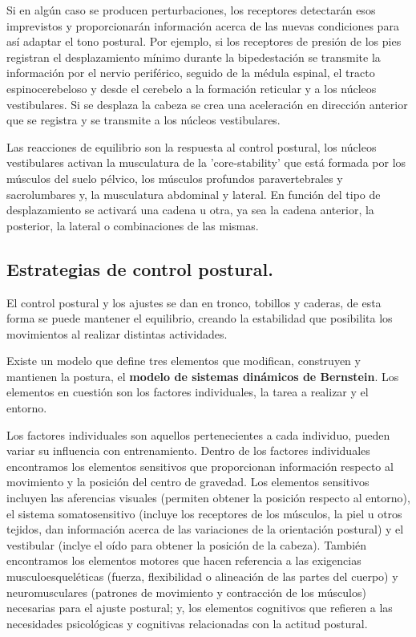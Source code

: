 Si en algún caso se producen perturbaciones, los receptores detectarán esos imprevistos y proporcionarán información acerca de las nuevas condiciones para así adaptar el tono postural. Por ejemplo, si los receptores de presión de los pies registran el desplazamiento mínimo durante la bipedestación se transmite la información por el nervio periférico, seguido de la médula espinal, el tracto espinocerebeloso y desde el cerebelo a la formación reticular y a los núcleos vestibulares. Si se desplaza la cabeza se crea una aceleración en dirección anterior que se registra y se transmite a los núcleos vestibulares. 

Las reacciones de equilibrio son la respuesta al control postural, los núcleos vestibulares activan la musculatura de la 'core-stability' que está formada por los músculos del suelo pélvico, los músculos profundos paravertebrales y sacrolumbares y, la musculatura abdominal y lateral. En función del tipo de desplazamiento se activará una cadena u otra, ya sea la cadena anterior, la posterior, la lateral o combinaciones de las mismas.

\subsection{Estrategias de control postural.} 
El control postural y los ajustes se dan en tronco, tobillos y caderas, de esta forma se puede mantener el equilibrio, creando la estabilidad que posibilita los movimientos al realizar distintas actividades.

Existe un modelo que define tres elementos que modifican, construyen y mantienen la postura, el \textbf{modelo de sistemas dinámicos de Bernstein}. Los elementos en cuestión son los factores individuales, la tarea a realizar y el entorno. 

Los factores individuales son aquellos pertenecientes a cada individuo, pueden variar su influencia con entrenamiento. Dentro de los factores individuales encontramos los elementos sensitivos que proporcionan información respecto al movimiento y la posición del centro de gravedad. Los elementos sensitivos incluyen las aferencias visuales (permiten obtener la posición respecto al entorno), el sistema somatosensitivo (incluye los receptores de los músculos, la piel u otros tejidos, dan información acerca de las variaciones de la orientación postural) y el vestibular (inclye el oído para obtener la posición de la cabeza). También encontramos los elementos motores que hacen referencia a las exigencias musculoesqueléticas (fuerza, flexibilidad o alineación de las partes del cuerpo) y neuromusculares (patrones de movimiento y contracción de los músculos)  necesarias para el ajuste postural; y, los elementos cognitivos que refieren a las necesidades psicológicas y cognitivas relacionadas con la actitud postural.

